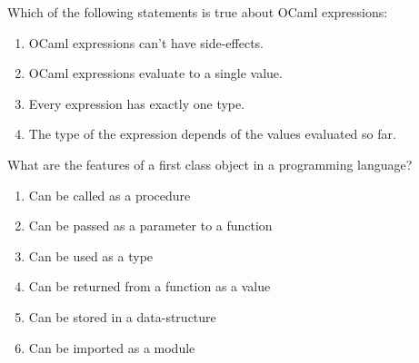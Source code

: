 \documentclass[addpoints,11pt]{exam}
\begin{document}
\begin{questions}
\begin{enumerate}
\end{enumerate}\question Which of the following statements is true about OCaml expressions:
\begin{enumerate}
\item OCaml expressions can't have side-effects.
\item OCaml expressions evaluate to a single value.
\item Every expression has exactly one type.
\item The type of the expression depends of the values evaluated so far.
\end{enumerate}\question What are the features of a first class object in a programming language?
\begin{enumerate}
\item Can be called as a procedure
\item Can be passed as a parameter to a function
\item Can be used as a type
\item Can be returned from a function as a value
\item Can be stored in a data-structure
\item Can be imported as a module
\end{enumerate}\end{questions}
\end{document}
